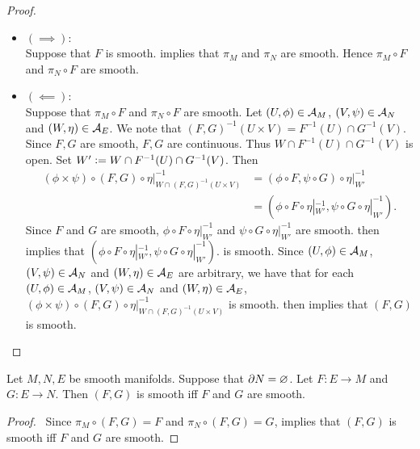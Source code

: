 \documentclass{book}
\begin{document}
\begin{proof}\
	\begin{itemize}
		\item $(\implies)$: \\
		Suppose that $F$ is smooth.  implies that $\pi_M$ and $\pi_N$ are smooth. Hence $\pi_M \circ F$ and $\pi_N \circ F$ are smooth.
		\item $(\impliedby)$: \\
		Suppose that $\pi_M \circ F$ and $\pi_N \circ F$ are smooth. Let $(U, \phi) \in \mathcal{A}_M$, $(V, \psi) \in \mathcal{A}_N$ and $(W, \eta) \in \mathcal{A}_E$. We note that $(F,G)^{-1}(U \times V) = F^{-1}(U) \cap G^{-1}(V)$. Since $F,G$ are smooth, $F,G$ are continuous. Thus $W \cap F^{-1}(U) \cap G^{-1}(V)$ is open. Set $W' \vcentcolon= W \cap F^{-1}(U) \cap G^{-1}(V)$. Then
		\begin{align*}
			(\phi \times \psi) \circ (F, G) \circ \eta|_{W \cap (F, G)^{-1}(U \times V)}^{-1}
			& = (\phi \circ F, \psi \circ G) \circ \eta|_{W'}^{-1} \\
			& = (\phi \circ F \circ \eta|_{W'}^{-1}, \psi \circ G \circ \eta|_{W'}^{-1}).
		\end{align*}
		Since $F$ and $G$ are smooth, $\phi \circ F \circ \eta|_{W'}^{-1}$ and $\psi \circ G \circ \eta|_{W'}^{-1}$ are smooth. \rex{}  then implies that $(\phi \circ F \circ \eta|_{W'}^{-1}, \psi \circ G \circ \eta|_{W'}^{-1})$. is smooth. Since $(U, \phi) \in \mathcal{A}_M$, $(V, \psi) \in \mathcal{A}_N$ and $(W, \eta) \in \mathcal{A}_E$ are arbitrary, we have that for each $(U, \phi) \in \mathcal{A}_M$, $(V, \psi) \in \mathcal{A}_N$ and $(W, \eta) \in \mathcal{A}_E$, $(\phi \times \psi) \circ (F, G) \circ \eta|_{W \cap (F, G)^{-1}(U \times V)}^{-1}$ is smooth.  then implies that $(F, G)$ is smooth.
	\end{itemize}
\end{proof}

\begin{ex} 
	Let $M, N, E$ be smooth manifolds. Suppose that $\partial N = \varnothing$. Let $F: E \rightarrow M$ and $G: E \rightarrow N$. Then $(F, G)$ is smooth iff $F$ and $G$ are smooth.  
\end{ex}

\begin{proof}\
	Since $\pi_M \circ (F, G) = F$ and $\pi_N \circ (F, G) = G$,  implies that $(F, G)$ is smooth iff $F$ and $G$ are smooth. 
\end{proof}
\end{document}
